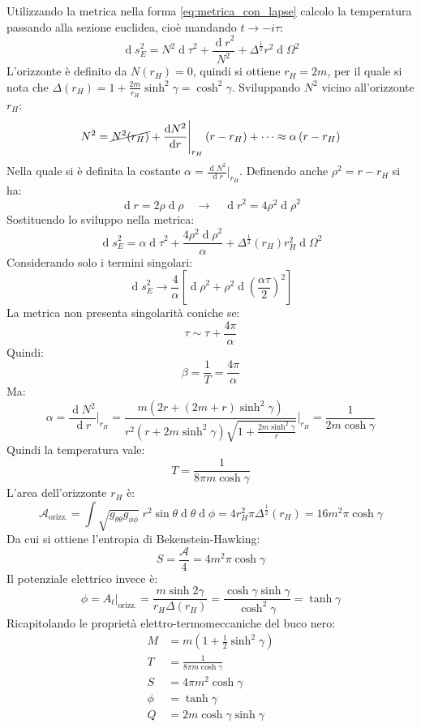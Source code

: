 \documentclass[]{scrartcl}
\renewcommand{\d}[1]{\ensuremath{\operatorname{d}\!{#1}}}
\begin{document}
%
Utilizzando la metrica nella forma \eqref{eq:metrica_con_lapse} calcolo la temperatura passando alla sezione euclidea, cioè mandando $ t \to -i \tau $:
\[
  \d s^2_E = N^2 \d \tau^2 + \frac{\d r^2}{N^2} + \Delta^{\frac{1}{2}}r^2 \d \Omega^2
\]
L'orizzonte è definito da $ N(r_H) = 0 $, quindi si ottiene $ r_H = 2m $, per il quale si nota che $ \Delta(r_H) = 1 + \frac{2m}{r_H}\sinh^2 \gamma = \cosh^2 \gamma $.
Sviluppando $ N^2 $ vicino all'orizzonte $ r_H $:
\[
  N^2 = \cancel{N^2(r_H)} + \frac{\d N^2}{\d r} \Biggr\lvert_{r_H} \left( r - r_H \right) + \dots \approx \alpha \left( r - r_H \right)
\]
Nella quale si è definita la costante $ \alpha =  \frac{\d N^2}{\d r} \lvert_{r_H} $.
Definendo anche $ \rho^2 = r - r_H $ si ha:
\[
  \d r = 2 \rho \d \rho \quad \rightarrow \quad \d r^2 = 4 \rho^2 \d \rho^2
\]
Sostituendo lo sviluppo nella metrica:
\[
  \d s^2_E = \alpha \d \tau^2 + \frac{4 \rho^2 \d \rho^2}{\alpha} + \Delta^{\frac{1}{2}}(r_H)r_H^2 \d \Omega^2
\]
Considerando solo i termini singolari:
\[
  \d s^2_E \to \frac{4}{\alpha} \left[ \d \rho^2 + \rho^2 \d{ \left( \frac{\alpha \tau}{2} \right)^2} \right]
\]
La metrica non presenta singolarità coniche se:
\[
  \tau \sim \tau + \frac{4\pi}{\alpha}
\]
Quindi:
\[
  \beta = \frac{1}{T} = \frac{4\pi}{\alpha}
\]
Ma:
\[
  \alpha =  \frac{\d N^2}{\d r} \Biggr\lvert_{r_H} = \frac{m \left( 2r + (2m + r) \sinh^2 \gamma \right)}{r^2 (r + 2m \sinh^2\gamma) \sqrt{1 + \frac{2m\sinh^2 \gamma}{r}}}
  \Biggr\lvert_{r_H} = \frac{1}{2m \cosh \gamma}
\]
Quindi la temperatura vale:
\[
  T = \frac{1}{8 \pi m \cosh \gamma}
\]
L'area dell'orizzonte $ r_H $ è:
\[
  \mathcal{A}_{\mathrm{orizz.}} = \int \sqrt{g_{\theta\theta}g_{\phi\phi}}\; r^2 \sin\theta \d{\theta} \d{\phi} = 4 r_H^2 \pi \Delta^{\frac{1}{2}}(r_H) = 16 m^2 \pi \cosh \gamma
\]
Da cui si ottiene l'entropia di Bekenstein-Hawking:
\[
  S = \frac{\mathcal{A}}{4} =  4 m^2 \pi \cosh \gamma
\]
Il potenziale elettrico invece è:
\[
  \phi = A_t \lvert_{\mathrm{orizz.}} = \frac{m \sinh 2 \gamma}{r_H \Delta(r_H)} = \frac{\cosh \gamma \sinh \gamma}{\cosh^2 \gamma} = \tanh \gamma
\]
Ricapitolando le proprietà elettro-termomeccaniche del buco nero:
\begin{align*}
  M & = m \left( 1 + \frac{1}{2}\sinh^2 \gamma \right) \\
  T & = \frac{1}{8 \pi m \cosh \gamma} \\
  S & = 4 \pi m^2 \cosh \gamma \\
  \phi & = \tanh \gamma \\
  Q & = 2m \cosh \gamma \sinh \gamma
\end{align*}
\end{document}
